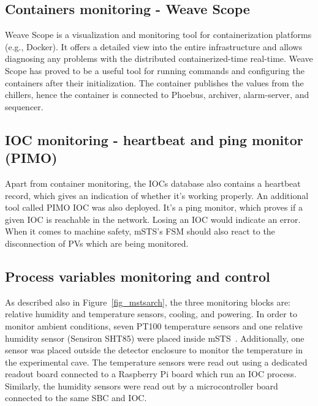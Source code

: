 \subsection{Containers monitoring - Weave Scope}

Weave Scope is a visualization and monitoring tool for containerization platforms (e.g., Docker). It offers a detailed view into the entire infrastructure and allows diagnosing any problems with the distributed containerized-time real-time. Weave Scope has proved to be a useful tool for running commands and configuring the containers after their initialization. The container publishes the values from the chillers, hence the container is connected to Phoebus, archiver, alarm-server, and sequencer. 
\subsection{IOC monitoring - heartbeat and ping monitor (PIMO)}
Apart from container monitoring, the \glspl{IOC} database also contains a heartbeat record, which gives an indication of whether it's working properly. An additional tool called PIMO \gls{IOC} was also deployed. It's a ping monitor, which proves if a given \gls{IOC} is reachable in the network. Losing an \gls{IOC} would indicate an error. When it comes to machine safety, \gls{mSTS}'s \gls{FSM} should also react to the disconnection of PVs which are being monitored.
\subsection{Process variables monitoring and control}
As described also in Figure~\ref{fig_mstsarch}, the three monitoring blocks are: relative humidity and temperature sensors, cooling, and powering. In  order to monitor ambient conditions, seven PT100 temperature sensors and one relative humidity sensor (Sensiron SHT85) were placed inside \gls{mSTS}~\cite{SHT85}. Additionally, one sensor was placed outside the detector enclosure to monitor the temperature in the experimental cave. The temperature sensors were read out using a dedicated readout board connected to a Raspberry Pi board which run an \gls{IOC} process. Similarly, the humidity sensors were read out by a microcontroller board connected to the same \gls{SBC} and \gls{IOC}.

